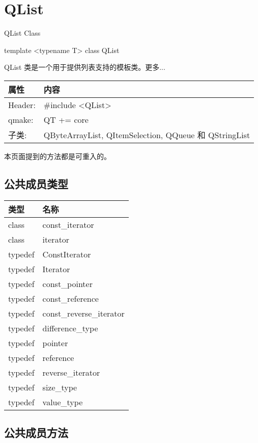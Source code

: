 \chapter{QList}

QList Class

template <typename T> class QList

QList 类是一个用于提供列表支持的模板类。更多...

\begin{tabular}{|l|l|}
\hline
属性 &	内容\\
\hline
Header:	&\#include <QList>\\
\hline
qmake: 	& QT += core\\
\hline
子类:& 	QByteArrayList, QItemSelection, QQueue 和 QStringList\\
\hline
\end{tabular}

\begin{notice}
本页面提到的方法都是可重入的。
\end{notice}

\section{公共成员类型}

\begin{tabular}{|l|l|}
\hline
类型 &	名称\\
\hline
class& 	const\_iterator\\
\hline
class& 	iterator\\
\hline
typedef& 	ConstIterator\\
\hline
typedef& 	Iterator\\
\hline
typedef& 	const\_pointer\\
\hline
typedef& 	const\_reference\\
\hline
typedef& 	const\_reverse\_iterator\\
\hline
typedef& 	difference\_type\\
\hline
typedef& 	pointer\\
\hline
typedef& 	reference\\
\hline
typedef& 	reverse\_iterator\\
\hline
typedef& 	size\_type\\
\hline
typedef& 	value\_type\\
\hline
\end{tabular}


\section{公共成员方法}


